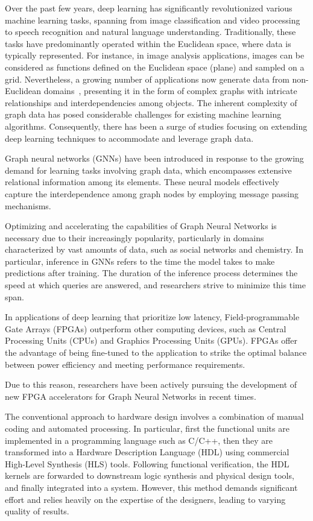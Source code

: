 Over the past few years, deep learning has significantly revolutionized various machine learning tasks,
spanning from image classification and video processing to speech recognition and natural language understanding.
Traditionally, these tasks have predominantly operated within the Euclidean space, where data is typically
represented.
For instance, in image analysis applications, images can be considered as functions defined on the Euclidean space (plane) and sampled on a grid.
Nevertheless, a growing number of applications now generate data from non-Euclidean domains~\cite{DBLP:journals/corr/BronsteinBLSV16},
presenting it in the form of complex graphs with intricate relationships and interdependencies among objects.
The inherent complexity of graph data has posed considerable challenges for existing machine learning algorithms.
Consequently, there has been a surge of studies focusing on extending deep learning techniques to accommodate
and leverage graph data.

Graph neural networks (GNNs) have been introduced in response to the growing demand for learning tasks involving
graph data, which encompasses extensive relational information among its elements.
These neural models effectively capture the interdependence among graph nodes by employing message passing mechanisms.

Optimizing and accelerating the capabilities of Graph Neural Networks is necessary due to their increasingly popularity, particularly in domains characterized by vast amounts of data,
such as social networks and chemistry.
In particular, inference in GNNs refers to the time the model takes to make predictions after training.
The duration of the inference process determines the speed at which queries are answered, and researchers strive to minimize this time span.

In applications of deep learning that prioritize low latency, Field-programmable Gate Arrays (FPGAs) outperform other computing devices, such as Central Processing Units (CPUs) and Graphics Processing Units (GPUs).
FPGAs offer the advantage of being fine-tuned to the application to strike the optimal balance between power efficiency and meeting performance requirements.

Due to this reason, researchers have been actively pursuing the development of new FPGA accelerators for Graph Neural Networks in recent times.

The conventional approach to hardware design involves a combination of manual coding and automated processing.
In particular, first the functional units are implemented in a programming language such as C/C++, then they are transformed into a Hardware Description Language (HDL) using commercial High-Level Synthesis (HLS) tools.
Following functional verification, the HDL kernels are forwarded to downstream logic synthesis and physical design tools, and finally integrated into a system.
However, this method demands significant effort and relies heavily on the expertise of the designers, leading to varying quality of results.

